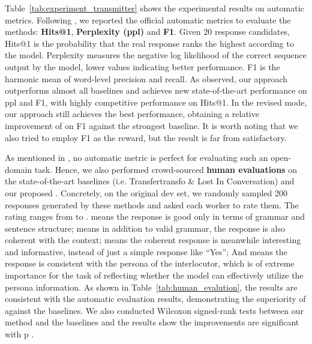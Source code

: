 \documentclass[11pt,a4paper]{article}
\begin{document}
\begin{table}[t]
    \centering
    \caption{Human evaluation results.}
    \label{tab:human_evalution}
    \vspace{-2mm}
\end{table}

Table~\ref{tab:experiment_transmitter} shows the experimental results on automatic metrics. Following \citet{zhang2018personalizing}, we reported the official automatic metrics to evaluate the methods: \textbf{Hits@1}, \textbf{Perplexity (ppl)} and \textbf{F1}. Given 20 response candidates, Hits@1 is the probability that the real response ranks the highest according to the model. Perplexity measures the negative log likelihood of the correct sequence output by the model, lower values indicating better performance. F1 is the harmonic mean of word-level precision and recall. As observed, our approach outperforms almost all baselines and achieves new state-of-the-art performance on ppl and F1, with highly competitive performance on Hits@1. In the revised mode, our approach still achieves the best performance, obtaining a relative improvement of  on F1 against the strongest baseline. It is worth noting that we also tried to employ F1 as the reward, but the result is far from satisfactory. 

As mentioned in \citet{dinan2019second}, no automatic metric is perfect for evaluating such an open-domain task. Hence, we also performed crowd-sourced \textbf{human evaluations} on the state-of-the-art baselines (i.e. Transfertransfo \& Lost In Conversation) and our proposed . Concretely, on the original dev set, we randomly sampled 200 responses generated by these methods and asked each worker to rate them. The rating ranges from  to .  means the response is good only in terms of grammar and sentence structure;  means in addition to valid grammar, the response is also coherent with the context;  means the coherent response is meanwhile interesting and informative, instead of just a simple response like “Yes”; And  means the response is consistent with the persona of the interlocutor, which is of extreme importance for the task of reflecting whether the model can effectively utilize the persona information. 
As shown in Table~\ref{tab:human_evalution}, the results are consistent with the automatic evaluation results, demonstrating the superiority of  against the baselines. We also conducted Wilcoxon signed-rank tests between our method and the baselines and the results show the improvements are significant with p  .
\end{document}
